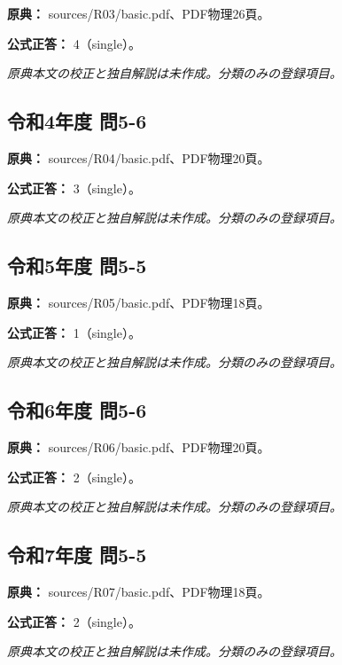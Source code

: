 \noindent\textbf{原典：} sources/R03/basic.pdf、PDF物理26頁。

\textbf{公式正答：} 4（single）。

\par\textit{原典本文の校正と独自解説は未作成。分類のみの登録項目。}

\subsection{令和4年度 問5-6}
\label{q:r04-reg-basic-5-6}

\noindent\textbf{原典：} sources/R04/basic.pdf、PDF物理20頁。

\textbf{公式正答：} 3（single）。

\par\textit{原典本文の校正と独自解説は未作成。分類のみの登録項目。}

\subsection{令和5年度 問5-5}
\label{q:r05-reg-basic-5-5}

\noindent\textbf{原典：} sources/R05/basic.pdf、PDF物理18頁。

\textbf{公式正答：} 1（single）。

\par\textit{原典本文の校正と独自解説は未作成。分類のみの登録項目。}

\subsection{令和6年度 問5-6}
\label{q:r06-reg-basic-5-6}

\noindent\textbf{原典：} sources/R06/basic.pdf、PDF物理20頁。

\textbf{公式正答：} 2（single）。

\par\textit{原典本文の校正と独自解説は未作成。分類のみの登録項目。}

\subsection{令和7年度 問5-5}
\label{q:r07-reg-basic-5-5}

\noindent\textbf{原典：} sources/R07/basic.pdf、PDF物理18頁。

\textbf{公式正答：} 2（single）。

\par\textit{原典本文の校正と独自解説は未作成。分類のみの登録項目。}

